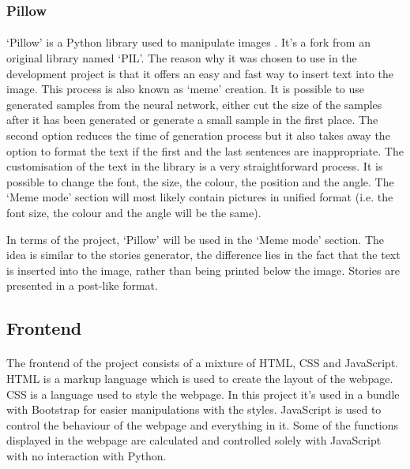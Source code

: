\documentclass[12pt]{report}
\begin{document}
\subsubsection*{Pillow}
\paragraph{}
`Pillow' is a Python library used to manipulate images \citep{pillow_lib}. It's a fork from an original library named
`PIL'. The reason why it was chosen to use in the development project is that it offers an easy and fast way
to insert text into the image. This process is also known as `meme' creation. It is possible to use generated samples
from the neural network, either cut the size of the samples after it has been generated or generate a small sample 
in the first place. The second option reduces the time of generation process but it also takes away the option
to format the text if the first and the last sentences are inappropriate. The customisation of the text in the library
is a very straightforward process. It is possible to change the font, the size, the colour, the position and the angle.
The `Meme mode' section will most likely contain pictures in unified format (i.e. the font size, the colour and the angle will
be the same).

In terms of the project, `Pillow' will be used in the `Meme mode' section. The idea is similar to the stories generator,
the difference lies in the fact that the text is inserted into the image, rather than being printed below the image.
Stories are presented in a post-like format.


\subsection*{Frontend}
\paragraph{}
The frontend of the project consists of a mixture of HTML, CSS and JavaScript. HTML is a markup language which is used
to create the layout of the webpage. CSS is a language used to style the webpage. In this project it's used in a
bundle with Bootstrap for easier manipulations with the styles. JavaScript is used to control the behaviour of
the webpage and everything in it. Some of the functions displayed in the webpage are calculated and controlled 
solely with JavaScript with no interaction with Python.
\end{document}
